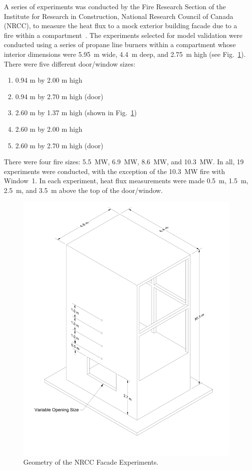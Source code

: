 A series of experiments was conducted by the Fire Research Section of the Institute for Research in Construction, National Research Council of Canada (NRCC), to measure the heat flux to a mock exterior building facade due to a fire within a compartment~\cite{Oleszkiewicz:ASME,Oleszkiewicz:FireTech}. The experiments selected for model validation were conducted using a series of propane line burners within a compartment whose interior dimensions were 5.95~m wide, 4.4~m deep, and 2.75~m high (see Fig.~\ref{NRCC_Facade_Drawing}). There were five different door/window sizes:
\begin{enumerate}
\item 0.94 m by 2.00 m high
\item 0.94 m by 2.70 m high (door)
\item 2.60 m by 1.37 m high (shown in Fig.~\ref{NRCC_Facade_Drawing})
\item 2.60 m by 2.00 m high
\item 2.60 m by 2.70 m high (door)
\end{enumerate}
There were four fire sizes: 5.5~MW, 6.9~MW, 8.6~MW, and 10.3~MW. In all, 19 experiments were conducted, with the exception of the 10.3~MW fire with Window~1. In each experiment, heat flux measurements were made 0.5~m, 1.5~m, 2.5~m, and 3.5~m above the top of the door/window.

\begin{figure}[p]
\includegraphics[width=\textwidth]{FIGURES/NRCC_Facade/NRCC_Facade}
\caption[Geometry of the NRCC Facade Experiments]{Geometry of the NRCC Facade Experiments.}
\label{NRCC_Facade_Drawing}
\end{figure}


